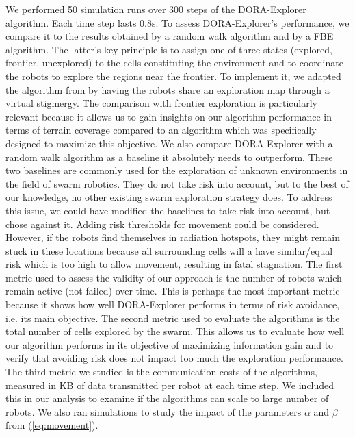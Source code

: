 We performed 50 simulation runs over 300 steps of the DORA-Explorer
algorithm. Each time step lasts 0.8s. To assess DORA-Explorer's performance, we compare it to the results
obtained by a random walk algorithm and by a FBE algorithm. The
latter's key principle is to assign one of three states (explored,
frontier, unexplored) to the cells constituting the environment and to
coordinate the robots to explore the regions near the frontier. To
implement it, we adapted the algorithm from
\cite{yamauchi1998frontier} by having the robots share an exploration
map through a virtual stigmergy. The comparison with frontier exploration is
particularly relevant because it allows us to gain insights on our
algorithm performance in terms of terrain coverage compared to an
algorithm which was specifically designed to maximize this
objective. We also compare DORA-Explorer with a random walk algorithm as a
baseline it absolutely needs to outperform. These two baselines are
commonly used for the exploration of unknown environments in the field
of swarm robotics. They do not take risk into account, but to the best
of our knowledge, no other existing swarm exploration strategy does. To address this issue, we could have modified the baselines to take risk into account, but chose against it. Adding risk thresholds for movement could be considered. However, if the robots find themselves in radiation hotspots, they might remain stuck in these locations because all surrounding cells will a have similar/equal risk which is too high to allow movement, resulting in fatal stagnation. The first metric used to assess the validity of our approach is the
number of robots which remain active (not failed) over time. This is
perhaps the most important metric because it shows how well DORA-Explorer
performs in terms of risk avoidance, i.e. its main objective. The
second metric used to evaluate the algorithms is the total number of
cells explored by the swarm. This allows us to evaluate how well our
algorithm performs in its objective of maximizing information gain and
to verify that avoiding risk does not impact too much the exploration
performance. The third metric we studied is the communication costs of
the algorithms, measured in KB of data transmitted per robot at
each time step. We included this in our analysis to examine if
the algorithms can scale to large number of robots. We also ran simulations to study the impact of the parameters $\alpha$ and $\beta$ from (\ref{eq:movement}). 


